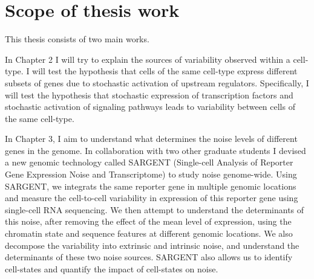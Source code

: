 \section{Scope of thesis work}

This thesis consists of two main works.

In  Chapter 2 I will try to explain the sources of variability observed within a cell-type. I will test the hypothesis that cells of the same cell-type express different subsets of genes due to stochastic activation of upstream regulators. Specifically, I will test the hypothesis that stochastic expression of transcription factors and stochastic activation of signaling pathways leads to variability between cells of the same cell-type.

In Chapter 3, I aim to understand what determines the noise levels of different genes in the genome. In collaboration with two other graduate students I devised a new genomic technology called SARGENT (Single-cell Analysis of Reporter Gene Expression Noise and Transcriptome) to study noise genome-wide. Using SARGENT, we integrats the same reporter gene in multiple genomic locations and measure the cell-to-cell variability in expression of this reporter gene using single-cell RNA sequencing. We then attempt to understand the determinants of this noise, after removing the effect of the mean level of expression, using the chromatin state and sequence features at different genomic locations. We also decompose the variability into extrinsic and intrinsic noise, and understand the determinants of these two noise sources. SARGENT also allows us to identify cell-states and quantify the impact of cell-states on noise.
